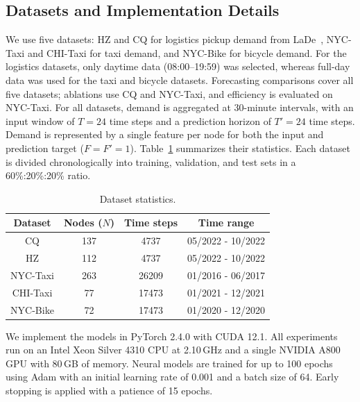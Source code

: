 \subsection{Datasets and Implementation Details}
We use five datasets: HZ and CQ for logistics pickup demand from LaDe~\cite{lade}, NYC-Taxi and CHI-Taxi for taxi demand, and NYC-Bike for bicycle demand.
For the logistics datasets, only daytime data (08:00–19:59) was selected, whereas full-day data was used for the taxi and bicycle datasets.
Forecasting comparisons cover all five datasets; ablations use CQ and NYC-Taxi, and efficiency is evaluated on NYC-Taxi.
For all datasets, demand is aggregated at 30-minute intervals, with an input window of $T=24$ time steps and a prediction horizon of $T'=24$ time steps.
Demand is represented by a single feature per node for both the input and prediction target ($F=F'=1$).
Table~\ref{datasets} summarizes their statistics.
Each dataset is divided chronologically into training, validation, and test sets in a 60\%:20\%:20\% ratio.

\begin{table}
\centering
\caption{Dataset statistics.}\label{datasets}
\begin{tabular}{c c c c}
\hline
Dataset &  Nodes ($N$) & Time steps & Time range\\
\hline
CQ & 137 & 4737 & 05/2022 - 10/2022\\
HZ & 112 & 4737 & 05/2022 - 10/2022\\
\hline
NYC-Taxi & 263 & 26209 & 01/2016 - 06/2017\\
CHI-Taxi & 77 & 17473 & 01/2021 - 12/2021\\
\hline
NYC-Bike & 72 & 17473 & 01/2020 - 12/2020\\
\hline
\end{tabular}
\end{table}

We implement the models in PyTorch 2.4.0 with CUDA 12.1.
All experiments run on an Intel Xeon Silver 4310 CPU at 2.10\,GHz and a single NVIDIA A800 GPU with 80\,GB of memory.
Neural models are trained for up to 100 epochs using Adam with an initial learning rate of 0.001 and a batch size of 64.
Early stopping is applied with a patience of 15 epochs.

